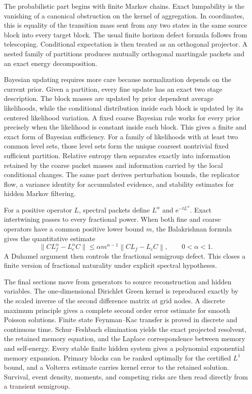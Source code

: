 \documentclass[11pt,letterpaper]{article}
\theoremstyle{plain}
\theoremstyle{plain}
\theoremstyle{plain}
\theoremstyle{definition}
\theoremstyle{definition}
\theoremstyle{definition}
\theoremstyle{definition}
\theoremstyle{definition}
\theoremstyle{remark}
\theoremstyle{remark}
\theoremstyle{remark}
\theoremstyle{remark}
\theoremstyle{remark}
\newcommand{\norm}[1]{\left\lVert#1\right\rVert}
\theoremstyle{remark}
\newcommand{\e}{\mathrm e}
\let\KomorebiPrimitivemathrm\mathrm
\renewcommand{\mathrm}[1]{{\KomorebiPrimitivemathrm{#1}}}
\begin{document}
The probabilistic part begins with finite Markov chains. Exact lumpability is the vanishing of a canonical obstruction on the kernel of aggregation. In coordinates, this is equality of the transition mass sent from any two states in the same source block into every target block. The usual finite horizon defect formula follows from telescoping. Conditional expectation is then treated as an orthogonal projector. A nested family of partitions produces mutually orthogonal martingale packets and an exact energy decomposition.

Bayesian updating requires more care because normalization depends on the current prior. Given a partition, every fine update has an exact two stage description. The block masses are updated by prior dependent average likelihoods, while the conditional distribution inside each block is updated by its centered likelihood variation. A fixed coarse Bayesian rule works for every prior precisely when the likelihood is constant inside each block. This gives a finite and exact form of Bayesian sufficiency. For a family of likelihoods with at least two common level sets, those level sets form the unique coarsest nontrivial fixed sufficient partition. Relative entropy then separates exactly into information retained by the coarse packet masses and information carried by the local conditional changes. The same part derives perturbation bounds, the replicator flow, a variance identity for accumulated evidence, and stability estimates for hidden Markov filtering.

For a positive operator \(L\), spectral packets define \(L^\alpha\) and \(\e^{-tL^\alpha}\). Exact intertwining passes to every fractional power. When both fine and coarse operators have a common positive lower bound \(m\), the Balakrishnan formula gives the quantitative estimate
\[
\norm{CL_f^\alpha-L_c^\alpha C}
\leq
\alpha m^{\alpha-1}
\norm{CL_f-L_cC},
\qquad 0<\alpha<1.
\]
A Duhamel argument then controls the fractional semigroup defect. This closes a finite version of fractional naturality under explicit spectral hypotheses.

The final sections move from generators to source reconstruction and hidden variables. The one-dimensional Dirichlet Green kernel is reproduced exactly by the scaled inverse of the second difference matrix at grid nodes. A discrete maximum principle gives a complete second order error estimate for smooth Poisson solutions. Finite state Feynman--Kac transfer is proved in discrete and continuous time. Schur--Feshbach elimination yields the exact projected resolvent, the retained memory equation, and the Laplace correspondence between memory and self-energy. Every stable finite hidden system gives a polynomial exponential memory expansion. Primary blocks can be ranked optimally for the certified \(L^1\) bound, and a Volterra estimate carries kernel error to the retained solution. Survival, event density, moments, and competing risks are then read directly from a transient semigroup.
\end{document}
